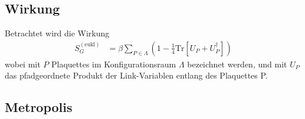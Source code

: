 

\subsection{Wirkung}

Betrachtet wird die Wirkung
\begin{align*}
  S_G^{(\textrm{eukl})} &= \beta \sum_{P \in \Lambda} \left(1-\frac{1}{4} \textrm{Tr} \left[ U_P + U_P^\dagger \right] \right)
\end{align*}
wobei mit $P$ Plaquettes im Konfigurationsraum $\Lambda$ bezeichnet werden, und mit $U_P$ das pfadgeordnete Produkt der Link-Variablen entlang des Plaquettes P.

\subsection{Metropolis}



